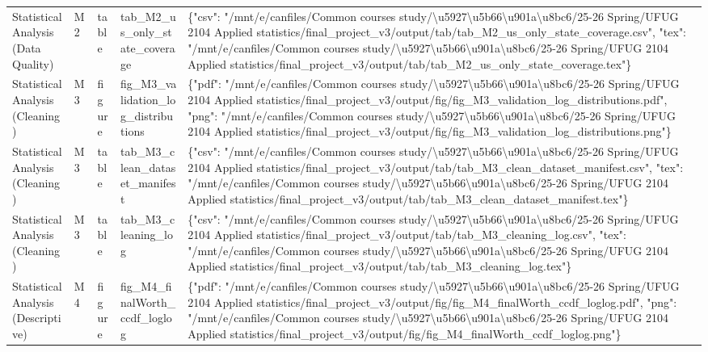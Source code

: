 \begin{tabular}{lllll}
Statistical Analysis (Data Quality) & M2 & table & tab\_M2\_us\_only\_state\_coverage & \{"csv": "/mnt/e/canfiles/Common courses study/\textbackslash u5927\textbackslash u5b66\textbackslash u901a\textbackslash u8bc6/25-26 Spring/UFUG 2104 Applied statistics/final\_project\_v3/output/tab/tab\_M2\_us\_only\_state\_coverage.csv", "tex": "/mnt/e/canfiles/Common courses study/\textbackslash u5927\textbackslash u5b66\textbackslash u901a\textbackslash u8bc6/25-26 Spring/UFUG 2104 Applied statistics/final\_project\_v3/output/tab/tab\_M2\_us\_only\_state\_coverage.tex"\} \\
Statistical Analysis (Cleaning) & M3 & figure & fig\_M3\_validation\_log\_distributions & \{"pdf": "/mnt/e/canfiles/Common courses study/\textbackslash u5927\textbackslash u5b66\textbackslash u901a\textbackslash u8bc6/25-26 Spring/UFUG 2104 Applied statistics/final\_project\_v3/output/fig/fig\_M3\_validation\_log\_distributions.pdf", "png": "/mnt/e/canfiles/Common courses study/\textbackslash u5927\textbackslash u5b66\textbackslash u901a\textbackslash u8bc6/25-26 Spring/UFUG 2104 Applied statistics/final\_project\_v3/output/fig/fig\_M3\_validation\_log\_distributions.png"\} \\
Statistical Analysis (Cleaning) & M3 & table & tab\_M3\_clean\_dataset\_manifest & \{"csv": "/mnt/e/canfiles/Common courses study/\textbackslash u5927\textbackslash u5b66\textbackslash u901a\textbackslash u8bc6/25-26 Spring/UFUG 2104 Applied statistics/final\_project\_v3/output/tab/tab\_M3\_clean\_dataset\_manifest.csv", "tex": "/mnt/e/canfiles/Common courses study/\textbackslash u5927\textbackslash u5b66\textbackslash u901a\textbackslash u8bc6/25-26 Spring/UFUG 2104 Applied statistics/final\_project\_v3/output/tab/tab\_M3\_clean\_dataset\_manifest.tex"\} \\
Statistical Analysis (Cleaning) & M3 & table & tab\_M3\_cleaning\_log & \{"csv": "/mnt/e/canfiles/Common courses study/\textbackslash u5927\textbackslash u5b66\textbackslash u901a\textbackslash u8bc6/25-26 Spring/UFUG 2104 Applied statistics/final\_project\_v3/output/tab/tab\_M3\_cleaning\_log.csv", "tex": "/mnt/e/canfiles/Common courses study/\textbackslash u5927\textbackslash u5b66\textbackslash u901a\textbackslash u8bc6/25-26 Spring/UFUG 2104 Applied statistics/final\_project\_v3/output/tab/tab\_M3\_cleaning\_log.tex"\} \\
Statistical Analysis (Descriptive) & M4 & figure & fig\_M4\_finalWorth\_ccdf\_loglog & \{"pdf": "/mnt/e/canfiles/Common courses study/\textbackslash u5927\textbackslash u5b66\textbackslash u901a\textbackslash u8bc6/25-26 Spring/UFUG 2104 Applied statistics/final\_project\_v3/output/fig/fig\_M4\_finalWorth\_ccdf\_loglog.pdf", "png": "/mnt/e/canfiles/Common courses study/\textbackslash u5927\textbackslash u5b66\textbackslash u901a\textbackslash u8bc6/25-26 Spring/UFUG 2104 Applied statistics/final\_project\_v3/output/fig/fig\_M4\_finalWorth\_ccdf\_loglog.png"\} \\

\end{tabular}
